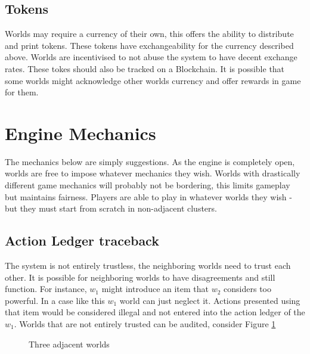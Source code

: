 \documentclass[runningheads,a4paper]{llncs}
\begin{document}
\subsection{Tokens}
Worlds may require a currency of their own, this offers the ability to distribute and print tokens. These tokens have exchangeability for the currency described above. Worlds are incentivised to not abuse the system to have decent exchange rates. These tokes should also be tracked on a Blockchain. It is possible that some worlds might acknowledge other worlds currency and offer rewards in game for them.

\section{Engine Mechanics} 
The mechanics below are simply suggestions. As the engine is completely open, worlds are free to impose whatever mechanics they wish. Worlds with drastically different game mechanics will probably not be bordering, this limits gameplay but maintains fairness. Players are able to play in whatever worlds they wish - but they must start from scratch in non-adjacent clusters.


\subsection{Action Ledger traceback}
\label{ALT}
The system is not entirely trustless, the neighboring worlds need to trust each other. It is possible for neighboring worlds to have disagreements and still function. For instance, $w_1$ might introduce an item that $w_2$ considers too powerful. In a case like this $w_1$ world can just neglect it. Actions presented using that item would be considered illegal and not entered into the action ledger of the $w_1$. Worlds that are not entirely trusted can be audited, consider Figure \ref{ThreeW} 

\begin{figure}
\caption{Three adjacent worlds}
\label{ThreeW}
\begin{center}
\end{center}
\end{figure}
\end{document}
